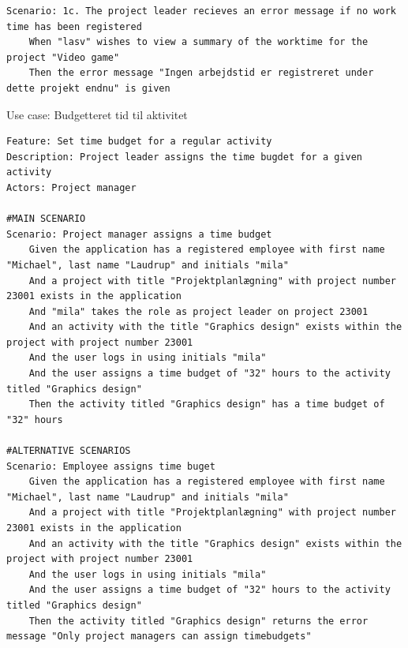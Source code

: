 \begin{listing}
\begin{verbatim}
Scenario: 1c. The project leader recieves an error message if no work time has been registered
    When "lasv" wishes to view a summary of the worktime for the project "Video game"
    Then the error message "Ingen arbejdstid er registreret under dette projekt endnu" is given
    \end{verbatim}
\end{listing}\clearpage
\begin{listing}[H]
    \centering
    \caption{Use case: Budgetteret tid til aktivitet}\label{lst:budget_time}
    \begin{verbatim}
Feature: Set time budget for a regular activity
Description: Project leader assigns the time bugdet for a given activity
Actors: Project manager

#MAIN SCENARIO
Scenario: Project manager assigns a time budget
    Given the application has a registered employee with first name "Michael", last name "Laudrup" and initials "mila"
    And a project with title "Projektplanlægning" with project number 23001 exists in the application
    And "mila" takes the role as project leader on project 23001
    And an activity with the title "Graphics design" exists within the project with project number 23001
    And the user logs in using initials "mila"
    And the user assigns a time budget of "32" hours to the activity titled "Graphics design"
    Then the activity titled "Graphics design" has a time budget of "32" hours

#ALTERNATIVE SCENARIOS
Scenario: Employee assigns time buget
    Given the application has a registered employee with first name "Michael", last name "Laudrup" and initials "mila"
    And a project with title "Projektplanlægning" with project number 23001 exists in the application
    And an activity with the title "Graphics design" exists within the project with project number 23001
    And the user logs in using initials "mila"
    And the user assigns a time budget of "32" hours to the activity titled "Graphics design"
    Then the activity titled "Graphics design" returns the error message "Only project managers can assign timebudgets"
    \end{verbatim}
\end{listing}
